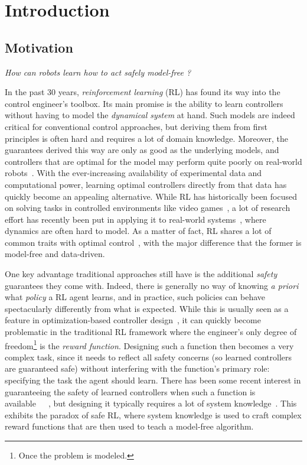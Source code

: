 \chapter{Introduction} \label{chap:intro}

\section{Motivation}
	\emph{How can robots learn how to act safely model-free ?} \par
	In the past 30 years, \emph{reinforcement learning} (RL) has found its way into the control engineer's toolbox. Its main promise is the ability to learn controllers without having to model the\emph{ dynamical system} at hand. Such models are indeed critical for conventional control approaches, but deriving them from first principles is often hard and requires a lot of domain knowledge. Moreover, the guarantees derived this way are only as good as the underlying models, and controllers that are optimal for the model may perform quite poorly on real-world robots~\needcite. With the ever-increasing availability of experimental data and computational power, learning optimal controllers directly from that data has quickly become an appealing alternative. While RL has historically been focused on solving tasks in controlled environments like video games~\needcite, a lot of research effort has recently been put in applying it to real-world systems~\needcite, where dynamics are often hard to model. As a matter of fact, RL shares a lot of common traits with optimal control~\cite{sutton1992reinforcement}, with the major difference that the former is model-free and data-driven. \par
	One key advantage traditional approaches still have is the additional\emph{ safety} guarantees they come with. Indeed, there is generally no way of knowing\emph{ a priori} what\emph{ policy} a RL agent learns, and in practice, such policies can behave spectacularly differently from what is expected. While this is usually seen as a feature in optimization-based controller design~\cite{baker2019emergent}, it can quickly become problematic in the traditional RL framework where the engineer's only degree of freedom\footnote{Once the problem is modeled.} is the\emph{ reward function}. Designing such a function then becomes a very complex task, since it needs to reflect all safety concerns (so learned controllers are guaranteed safe) without interfering with the function's primary role: specifying the task the agent should learn. There has been some recent interest in guaranteeing the safety of learned controllers when such a function is available~\cite{hans2008safe}~\cite{turchetta2016safe}~\cite{berkenkamp2016safe}, but designing it typically requires a lot of system knowledge~\needcite. This exhibits the paradox of safe RL, where system knowledge is used to craft complex reward functions that are then used to teach a model-free algorithm.\par
